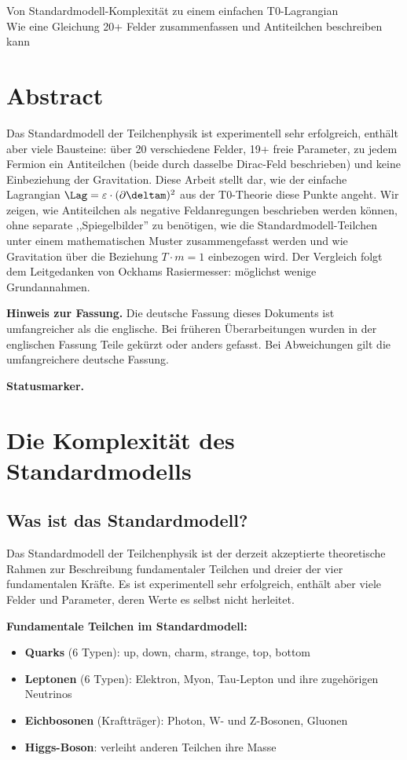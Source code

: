 Von Standardmodell-Komplexität zu einem einfachen T0-Lagrangian \\
	 Wie eine Gleichung 20+ Felder zusammenfassen und Antiteilchen beschreiben kann
\section*{Abstract}
		Das Standardmodell der Teilchenphysik ist experimentell sehr erfolgreich, enthält aber viele Bausteine: über 20 verschiedene Felder, 19+ freie Parameter, zu jedem Fermion ein Antiteilchen (beide durch dasselbe Dirac-Feld beschrieben) und keine Einbeziehung der Gravitation. Diese Arbeit stellt dar, wie der einfache Lagrangian $\Lag = \varepsilon \cdot (\partial \deltam)^2$ aus der T0-Theorie diese Punkte angeht. Wir zeigen, wie Antiteilchen als negative Feldanregungen beschrieben werden können, ohne separate ,,Spiegelbilder'' zu benötigen, wie die Standardmodell-Teilchen unter einem mathematischen Muster zusammengefasst werden und wie Gravitation über die Beziehung $T \cdot m = 1$ einbezogen wird. Der Vergleich folgt dem Leitgedanken von Ockhams Rasiermesser: möglichst wenige Grundannahmen.

	\medskip\noindent\textbf{Hinweis zur Fassung.} Die deutsche Fassung dieses Dokuments ist umfangreicher als die englische. Bei früheren Überarbeitungen wurden in der englischen Fassung Teile gekürzt oder anders gefasst. Bei Abweichungen gilt die umfangreichere deutsche Fassung.



\medskip\noindent\textbf{Statusmarker.}


	

	\section{Die Komplexität des Standardmodells}
	
	\subsection{Was ist das Standardmodell?}
	
	Das Standardmodell der Teilchenphysik ist der derzeit akzeptierte theoretische Rahmen zur Beschreibung fundamentaler Teilchen und dreier der vier fundamentalen Kräfte. Es ist experimentell sehr erfolgreich, enthält aber viele Felder und Parameter, deren Werte es selbst nicht herleitet.
	
	\textbf{Fundamentale Teilchen im Standardmodell:}
	\begin{itemize}
		\item \textbf{Quarks} (6 Typen): up, down, charm, strange, top, bottom
		\item \textbf{Leptonen} (6 Typen): Elektron, Myon, Tau-Lepton und ihre zugehörigen Neutrinos
		\item \textbf{Eichbosonen} (Kraftträger): Photon, W- und Z-Bosonen, Gluonen  
		\item \textbf{Higgs-Boson}: verleiht anderen Teilchen ihre Masse
	\end{itemize}
	
